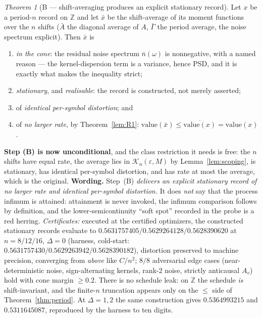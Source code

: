 \documentclass[11pt]{article}
\theoremstyle{definition}
\theoremstyle{remark}
\newtheorem{namedthm}{Theorem}
\begin{document}
\begin{namedthm}[B --- shift-averaging produces an explicit stationary
record]
\label{thm:shift}
Let $x$ be a period-$n$ record on $\mathbb Z$ and let $\bar x$ be the
shift-average of its moment functions over the $n$ shifts
($\bar A$ the diagonal average of $A$, $\bar\Gamma$ the period average,
the noise spectrum explicit). Then $\bar x$ is
\begin{enumerate}
\item[(i)] \emph{in the cone}: the residual noise spectrum
$\bar n(\omega)$ is nonnegative, with a named reason --- the
kernel-dispersion term is a variance, hence PSD, and it is exactly what
makes the inequality strict;
\item[(ii)] \emph{stationary}, and \emph{realisable}: the record is
constructed, not merely asserted;
\item[(iii)] of \emph{identical per-symbol distortion}; and
\item[(iv)] of \emph{no larger rate}, by Theorem~\ref{lem:R1}:
$\mathrm{value}(\bar x)\le\overline{\mathrm{value}(x)}
=\mathrm{value}(x)$.
\end{enumerate}
\textbf{Step (B) is now unconditional}, and the class restriction it
needs is free: the $n$ shifts have equal rate, the average lies in
$\mathcal K_n(\varepsilon,M)$ by Lemma~\ref{lem:scoping}, is
stationary, has identical per-symbol distortion, and has rate at most
the average, which is the original.
\textbf{Wording.} Step~(B) \emph{delivers an explicit stationary record
of no larger rate and identical per-symbol distortion.} It does
\emph{not} say that the process infimum is attained: attainment is
never invoked, the infimum comparison follows by definition, and the
lower-semicontinuity ``soft spot'' recorded in the probe is a red
herring. \emph{Certificates:} executed at the certified optimizers, the
constructed stationary records evaluate to
$0.5631757405/0.5629264128/0.5628390620$ at $n=8/12/16$, $\Delta=0$
(harness, cold-start: $0.5631757430/0.5629263942/0.5628390182$),
distortion preserved to machine precision, converging from
\emph{above} like $C/n^2$; $8/8$ adversarial edge cases
(near-deterministic noise, sign-alternating kernels, rank-$2$ noise,
strictly anticausal $A_v$) hold with cone margin $\ge0.2$. There is no
schedule leak: on $\mathbb Z$ the schedule \emph{is} shift-invariant,
and the finite-$n$ truncation appears only on the $\le$ side of
Theorem~\ref{thm:period}. At $\Delta=1,2$ the same construction gives
$0.5364993215$ and $0.5311645087$, reproduced by the harness to ten
digits.
\end{namedthm}
\end{document}
